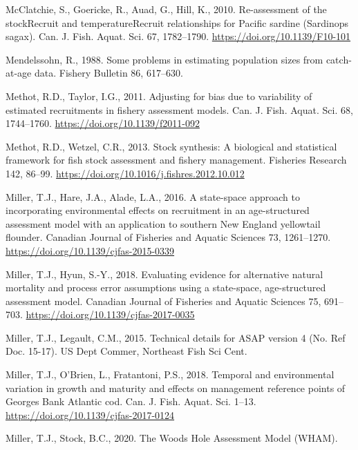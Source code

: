 \documentclass[]{article}
\begin{document}
\leavevmode\hypertarget{ref-mcclatchie2010Reassessment}{}%
McClatchie, S., Goericke, R., Auad, G., Hill, K., 2010. Re-assessment of
the stockRecruit and temperatureRecruit relationships for Pacific
sardine (Sardinops sagax). Can. J. Fish. Aquat. Sci. 67, 1782--1790.
\url{https://doi.org/10.1139/F10-101}

\leavevmode\hypertarget{ref-mendelssohn1988Problems}{}%
Mendelssohn, R., 1988. Some problems in estimating population sizes from
catch-at-age data. Fishery Bulletin 86, 617--630.

\leavevmode\hypertarget{ref-methot2011Adjusting}{}%
Methot, R.D., Taylor, I.G., 2011. Adjusting for bias due to variability
of estimated recruitments in fishery assessment models. Can. J. Fish.
Aquat. Sci. 68, 1744--1760. \url{https://doi.org/10.1139/f2011-092}

\leavevmode\hypertarget{ref-methot2013Stock}{}%
Methot, R.D., Wetzel, C.R., 2013. Stock synthesis: A biological and
statistical framework for fish stock assessment and fishery management.
Fisheries Research 142, 86--99.
\url{https://doi.org/10.1016/j.fishres.2012.10.012}

\leavevmode\hypertarget{ref-miller2016Statespace}{}%
Miller, T.J., Hare, J.A., Alade, L.A., 2016. A state-space approach to
incorporating environmental effects on recruitment in an age-structured
assessment model with an application to southern New England yellowtail
flounder. Canadian Journal of Fisheries and Aquatic Sciences 73,
1261--1270. \url{https://doi.org/10.1139/cjfas-2015-0339}

\leavevmode\hypertarget{ref-miller2018Evaluating}{}%
Miller, T.J., Hyun, S.-Y., 2018. Evaluating evidence for alternative
natural mortality and process error assumptions using a state-space,
age-structured assessment model. Canadian Journal of Fisheries and
Aquatic Sciences 75, 691--703.
\url{https://doi.org/10.1139/cjfas-2017-0035}

\leavevmode\hypertarget{ref-miller2015Technical}{}%
Miller, T.J., Legault, C.M., 2015. Technical details for ASAP version 4
(No. Ref Doc. 15-17). US Dept Commer, Northeast Fish Sci Cent.

\leavevmode\hypertarget{ref-miller2018Temporal}{}%
Miller, T.J., O'Brien, L., Fratantoni, P.S., 2018. Temporal and
environmental variation in growth and maturity and effects on management
reference points of Georges Bank Atlantic cod. Can. J. Fish. Aquat. Sci.
1--13. \url{https://doi.org/10.1139/cjfas-2017-0124}

\leavevmode\hypertarget{ref-miller2020Woods}{}%
Miller, T.J., Stock, B.C., 2020. The Woods Hole Assessment Model (WHAM).
\end{document}
